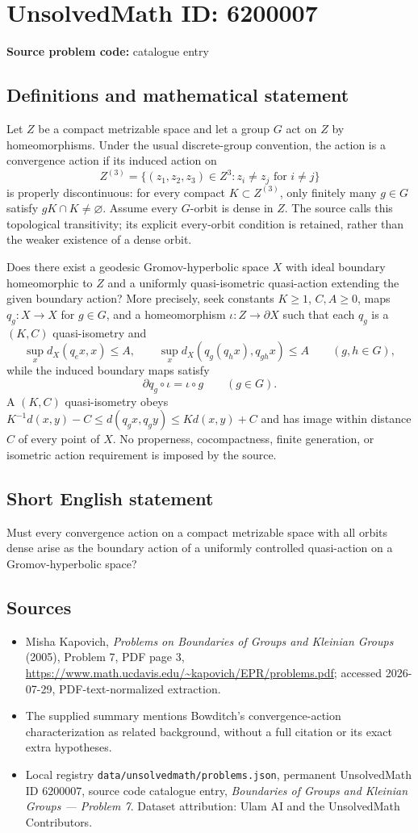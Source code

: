 \documentclass[11pt]{article}
\begin{document}
\section*{UnsolvedMath ID: 6200007}
\textbf{Source problem code:} catalogue entry
\subsection{Definitions and mathematical statement}
Let $Z$ be a compact metrizable space and let a group $G$ act on $Z$ by homeomorphisms. Under the usual discrete-group convention, the action is a convergence action if its induced action on
\[
Z^{(3)}=\{(z_1,z_2,z_3)\in Z^3:z_i\ne z_j\text{ for }i\ne j\}
\]
is properly discontinuous: for every compact $K\subset Z^{(3)}$, only finitely many $g\in G$ satisfy $gK\cap K\ne\varnothing$. Assume every $G$-orbit is dense in $Z$. The source calls this topological transitivity; its explicit every-orbit condition is retained, rather than the weaker existence of a dense orbit.

Does there exist a geodesic Gromov-hyperbolic space $X$ with ideal boundary homeomorphic to $Z$ and a uniformly quasi-isometric quasi-action extending the given boundary action? More precisely, seek constants $K\geq1$, $C,A\geq0$, maps $q_g:X\to X$ for $g\in G$, and a homeomorphism $\iota:Z\to\partial X$ such that each $q_g$ is a $(K,C)$ quasi-isometry and
\[
\sup_x d_X(q_e x,x)\leq A,\qquad
\sup_x d_X(q_g(q_hx),q_{gh}x)\leq A\qquad(g,h\in G),
\]
while the induced boundary maps satisfy
\[
\partial q_g\circ\iota=\iota\circ g\qquad(g\in G).
\]
A $(K,C)$ quasi-isometry obeys $K^{-1}d(x,y)-C\leq d(q_gx,q_gy)\leq Kd(x,y)+C$ and has image within distance $C$ of every point of $X$. No properness, cocompactness, finite generation, or isometric action requirement is imposed by the source.
\subsection{Short English statement}
Must every convergence action on a compact metrizable space with all orbits dense arise as the boundary action of a uniformly controlled quasi-action on a Gromov-hyperbolic space?
\subsection{Sources}
\begin{itemize}
\item Misha Kapovich, \emph{Problems on Boundaries of Groups and Kleinian Groups} (2005), Problem 7, PDF page 3, \url{https://www.math.ucdavis.edu/~kapovich/EPR/problems.pdf}; accessed 2026-07-29, PDF-text-normalized extraction.
\item The supplied summary mentions Bowditch's convergence-action characterization as related background, without a full citation or its exact extra hypotheses.
\item Local registry \texttt{data/unsolvedmath/problems.json}, permanent UnsolvedMath ID $6200007$, source code catalogue entry, \emph{Boundaries of Groups and Kleinian Groups --- Problem 7}. Dataset attribution: Ulam AI and the UnsolvedMath Contributors.
\end{itemize}
\end{document}
